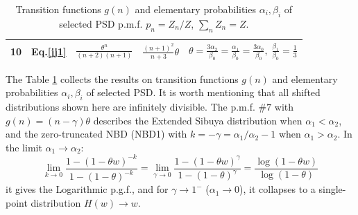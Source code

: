 \documentclass[a4paper,12pt]{amsart}
\newcommand{\ffrac}[2]{\ensuremath{\frac{\displaystyle #1}{\displaystyle #2}}}
\theoremstyle{definition}
\theoremstyle{remark}
\begin{document}
\begin{table}[hbt]
\begin{tabular}{|l|l|c|c|c|}
         \hline \hline
        10& Eq.\ref{jj1} & $\ffrac{\theta^n}{(n+2)(n+1)}$ & $\ffrac{(n+1)^2}{n+3}\theta$  & $\theta\!=\!\ffrac{3\alpha_2}{\beta_0}\!=\!\ffrac{\alpha_1}{\beta_0}\!=\!\ffrac{3\alpha_0}{\beta_0},\; \ffrac{\beta_1}{\beta_0}\!=\!\ffrac{1}{3}$   \\
        \hline 
    \end{tabular}
    \vspace{.2cm}
    \caption{Transition functions $g(n)$ and elementary probabilities $\alpha_i,\beta_i$ of selected PSD p.m.f. $p_n=Z_n/Z$, $\sum_n Z_n=Z$. }\label{tab:mark}
    \end{table}


The Table \ref{tab:mark} collects the results on transition functions $g(n)$ and elementary probabilities $\alpha_i,\beta_i$ of selected PSD.  It is worth mentioning that all shifted distributions shown here are infinitely divisible. The p.m.f. $\# 7$ with $g(n)=(n-\gamma)\theta$ describes the Extended Sibuya distribution when $\alpha_1 < \alpha_2$, and the zero-truncated NBD (NBD1) with $k=-\gamma=\alpha_1/\alpha_2-1$ when $\alpha_1>\alpha_2$. In the limit $\alpha_1 \to \alpha_2$:
\begin{equation}
\lim_{k \to 0}\frac{1 -(1- \theta w)^{-k}}{1- (1 -\theta)^{-k}}=\lim_{\gamma \to 0}\frac{1 -(1- \theta w)^{\gamma}}{1- (1 -\theta)^{\gamma}} = \frac{\log(1-\theta w)}{\log(1-\theta)} 
 \label{logpgf}   
\end{equation}
 it gives the Logarithmic p.g.f., and for $\gamma \to 1^{-}$ ($\alpha_1\to 0$), it collapses to a single-point distribution  $H(w) \to w$.
\end{document}
